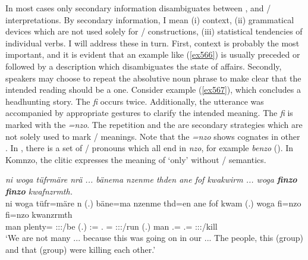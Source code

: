 In most cases only secondary information disambiguates between ,  and / interpretations. By secondary information, I mean (i) context, (ii) grammatical devices which are not used solely for / constructions, (iii) statistical tendencies of individual verbs. I will address these in turn. First, context is probably the most important, and it is evident that an example like (\ref{ex566}) is usually preceded or followed by a description which disambiguates the state of affairs. Secondly, speakers may choose to repeat the absolutive noun phrase to make clear that the intended reading should be a  one. Consider example (\ref{ex567}), which concludes a headhunting story. The  \emph{fi} occurs twice. Additionally, the utterance was accompanied by appropriate gestures to clarify the intended  meaning. The  \emph{fi} is marked with the   \emph{=nzo}. The repetition and the   are secondary strategies which are not solely used to mark / meanings. Note that the   \emph{=nzo} shows cognates in other . In , there is a set of / pronouns which all end in \emph{nzo}, for example \emph{benzo} \Ssg{} (\citealt[1072]{Evans:2015wy}). In Komnzo, the  clitic expresses the meaning of `only' without / semantics.

\begin{exe}
	\ex \emph{ni woga tüfrmäre nrä ... bänema nzenme thden ane fof kwakwirm ... woga \textbf{finzo} \textbf{finzo} kwafnzrmth.}\\
	\gll ni woga tüfr=märe n (.) bäne=ma nzenme thd=en ane fof kwam (.) woga fi=nzo fi=nzo kwanzrmth\\
	\Fnsg{} man plenty=\Priv{} \Fpl:\Sbj:\Nonpast:\Ipfv/be (.) \Dem:\Med=\Char{} \Fnsg.\Poss{} =\Loc{} \Dem{} \Emph{} \Stsg:\Sbj:\Pst:\Dur/run (.) man \Third.\Abs=\Only{} \Third.\Abs=\Only{} \Stpl:\Sbj:\Pst:\Dur/kill\\
	\trans `We are not many ... because this was going on in our  ... The people, this (group) and that (group) were killing each other.'
	\label{ex567}
\end{exe}

